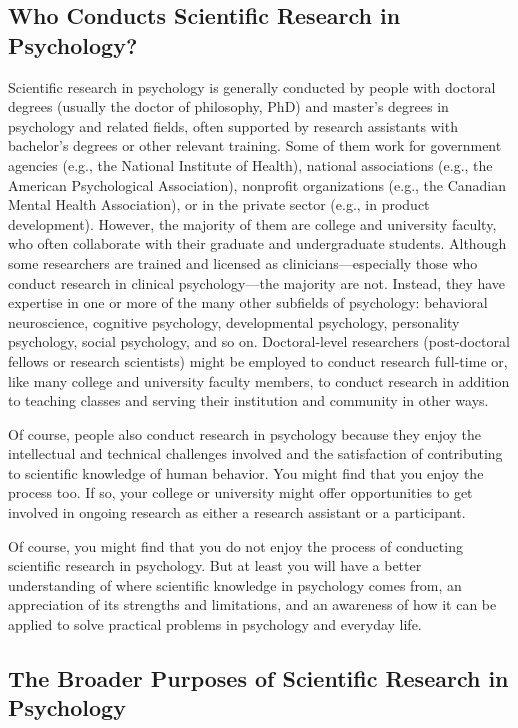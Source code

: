 \documentclass[]{book}
\theoremstyle{definition}
\theoremstyle{definition}
\theoremstyle{remark}
\begin{document}
\subsection{Who Conducts Scientific Research in
Psychology?}\label{who-conducts-scientific-research-in-psychology}

Scientific research in psychology is generally conducted by people with
doctoral degrees (usually the doctor of philosophy, PhD) and master's
degrees in psychology and related fields, often supported by research
assistants with bachelor's degrees or other relevant training. Some of
them work for government agencies (e.g., the National Institute of
Health), national associations (e.g., the American Psychological
Association), nonprofit organizations (e.g., the Canadian Mental Health
Association), or in the private sector (e.g., in product development).
However, the majority of them are college and university faculty, who
often collaborate with their graduate and undergraduate students.
Although some researchers are trained and licensed as
clinicians---especially those who conduct research in clinical
psychology---the majority are not. Instead, they have expertise in one
or more of the many other subfields of psychology: behavioral
neuroscience, cognitive psychology, developmental psychology,
personality psychology, social psychology, and so on. Doctoral-level
researchers (post-doctoral fellows or research scientists) might be
employed to conduct research full-time or, like many college and
university faculty members, to conduct research in addition to teaching
classes and serving their institution and community in other ways.

Of course, people also conduct research in psychology because they enjoy
the intellectual and technical challenges involved and the satisfaction
of contributing to scientific knowledge of human behavior. You might
find that you enjoy the process too. If so, your college or university
might offer opportunities to get involved in ongoing research as either
a research assistant or a participant.

Of course, you might find that you do not enjoy the process of
conducting scientific research in psychology. But at least you will have
a better understanding of where scientific knowledge in psychology comes
from, an appreciation of its strengths and limitations, and an awareness
of how it can be applied to solve practical problems in psychology and
everyday life.

\subsection{The Broader Purposes of Scientific Research in
Psychology}\label{the-broader-purposes-of-scientific-research-in-psychology}
\end{document}

